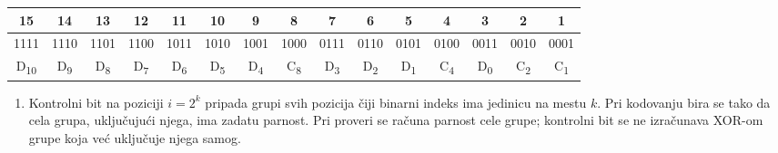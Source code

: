 \documentclass[a4paper,11pt]{article}
\numberwithin{equation}{section}
\newcommand{\redlinija}{\arrayrulecolor{black!28}\specialrule{0.3pt}{2pt}{2pt}\arrayrulecolor{black}}
\begin{document}
\begin{center}\begin{minipage}{\linewidth}\centering\captionsetup{hypcap=false}
\label{tab:informacioni}
\begin{adjustbox}{max width=\linewidth}
\begin{tabular}{ccccccccccccccc}\toprule
15 & 14 & 13 & 12 & 11 & 10 & 9 & 8 & 7 & 6 & 5 & 4 & 3 & 2 & 1 \\
\midrule
1111 & 1110 & 1101 & 1100 & 1011 & 1010 & 1001 & 1000 & 0111 & 0110 & 0101 & 0100 & 0011 & 0010 & 0001 \\
\redlinija
D\textsubscript{10} & D\textsubscript{9} & D\textsubscript{8} & D\textsubscript{7} & D\textsubscript{6} & D\textsubscript{5} & D\textsubscript{4} & C\textsubscript{8} & D\textsubscript{3} & D\textsubscript{2} & D\textsubscript{1} & C\textsubscript{4} & D\textsubscript{0} & C\textsubscript{2} & C\textsubscript{1} \\
\bottomrule\end{tabular}\end{adjustbox}\end{minipage}\end{center}


\begin{enumerate}[label=\arabic*.,start=4,leftmargin=*]
\item Kontrolni bit na poziciji $i=2^k$ pripada grupi svih pozicija čiji binarni indeks ima jedinicu na mestu $k$. Pri kodovanju bira se tako da cela grupa, uključujući njega, ima zadatu parnost. Pri proveri se računa parnost cele grupe; kontrolni bit se ne izračunava XOR-om grupe koja već uključuje njega samog.

\end{enumerate}
\end{document}
